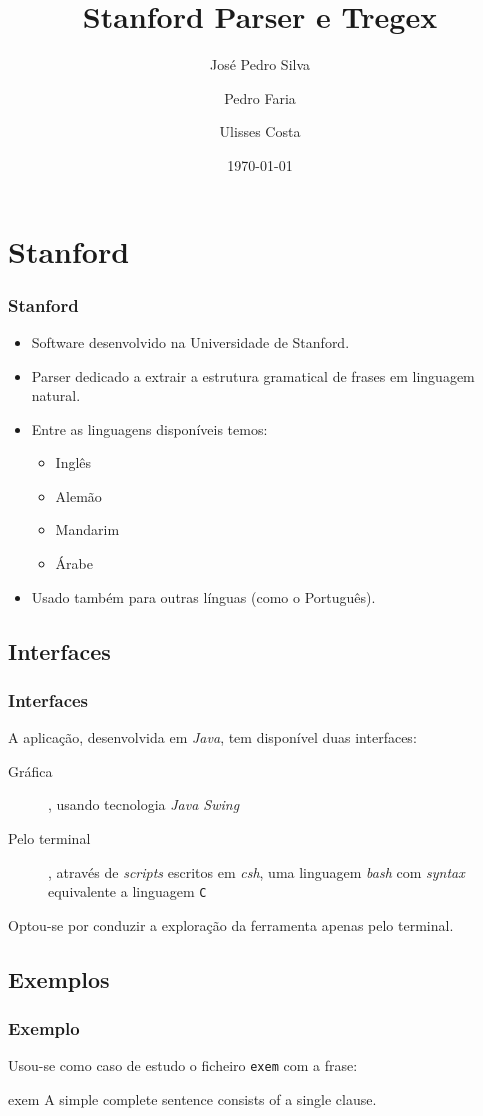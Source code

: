 \documentclass{beamer}
\title{Stanford Parser e Tregex}
\author{José Pedro Silva \and
Pedro Faria \and
Ulisses Costa
}
\date{\today}
\institute{Engenharia de Linguagens\\
Processamento de Linguagem Natural
}
\begin{document}
\begin{frame}
   \titlepage
\end{frame}

\section{Stanford}
\begin{frame} \frametitle{Stanford}
\begin{itemize}
 \item Software desenvolvido na Universidade de Stanford.
 \item Parser dedicado a extrair a estrutura gramatical de frases em linguagem natural.
 \item Entre as linguagens disponíveis temos: \begin{itemize}
                                               \item Inglês
					       \item Alemão
					       \item Mandarim
					       \item Árabe
                                              \end{itemize}
 \item Usado também para outras línguas (como o Português).
\end{itemize}

\end{frame}

\subsection{Interfaces}
\begin{frame} \frametitle{Interfaces}
 A aplicação, desenvolvida em \emph{Java}, tem disponível duas interfaces:
\begin{description}
 \item [Gráfica], usando tecnologia \emph{Java Swing}
 \item [Pelo terminal], através de \emph{scripts} escritos em \emph{csh}, uma linguagem \emph{bash} com \emph{syntax} equivalente a linguagem \texttt{C}
\end{description}
Optou-se por conduzir a exploração da ferramenta apenas pelo terminal.
\end{frame}

\subsection{Exemplos}
\begin{frame} \frametitle{Exemplo}
 Usou-se como caso de estudo o ficheiro \texttt{exem} com a frase:
 
\begin{block}{exem}
A simple complete sentence consists of a single clause.
\end{block}

\end{frame}
\end{document}
